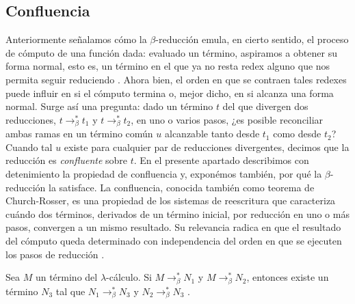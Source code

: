 \subsection{Confluencia}\label{sec:confluencia}
Anteriormente señalamos cómo la $\beta$-reducción emula, en cierto sentido, el proceso de cómputo de una función dada: evaluado un término, aspiramos a obtener su forma normal, esto es, un término en el que ya no resta redex alguno que nos permita seguir reduciendo \citep{barendregt1984, pierce2002}.
\newline
\newline
Ahora bien, el orden en que se contraen tales redexes puede influir en si el cómputo termina o, mejor dicho, en si alcanza una forma normal. Surge así una pregunta: dado un término $t$ del que divergen dos reducciones, $t \to_\beta^{\ast} t_1$ y $t \to_\beta^{\ast} t_2$, en uno o varios pasos, ¿es posible reconciliar ambas ramas en un término común $u$ alcanzable tanto desde $t_1$ como desde $t_2$? Cuando tal $u$ existe para cualquier par de reducciones divergentes, decimos que la reducción es \textit{confluente} sobre $t$.
\newline
\newline
En el presente apartado describimos con detenimiento la propiedad de confluencia y, exponémos también, por qué la $\beta$-reducción la satisface.
\newline
\newline
La confluencia, conocida también como teorema de Church-Rosser, es una propiedad de los sistemas de reescritura que caracteriza cuándo dos términos, derivados de un término inicial, por reducción en uno o más pasos, convergen a un mismo resultado. Su relevancia radica en que el resultado del cómputo queda determinado con independencia del orden en que se ejecuten los pasos de reducción \citep{barendregt1984}.

\begin{theorem}
  Sea $M$ un término del $\lambda$-cálculo. Si $M\to_\beta^{\ast}N_1$ y $M\to_\beta^{\ast}N_2$, entonces existe un término $N_3$ tal que $N_1\to_\beta^{\ast}N_3$ y $N_2\to_\beta^{\ast}N_3$ \citep[p.~23]{barendregt1984}.
\end{theorem}
\medskip

